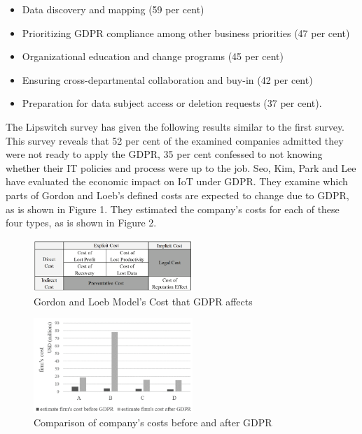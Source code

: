 \documentclass[11pt,english]{article}
\begin{document}
\begin{itemize}
  \item Data discovery and mapping (59 per cent)
  \item Prioritizing GDPR compliance among other business priorities (47 per cent)
  \item Organizational education and change programs (45 per cent)
  \item Ensuring cross-departmental collaboration and buy-in (42 per cent)
  \item Preparation for data subject access or deletion requests (37 per cent).
\end{itemize}
\quad The Lipswitch survey \cite{lipswitch} has given the following results similar to the first survey. This survey reveals that 52 per cent of the examined companies admitted they were not ready to apply the GDPR, 35 per cent confessed to not knowing whether their IT policies and process were up to the job. Seo, Kim, Park and Lee \cite{8190804} have evaluated the economic impact on IoT under
GDPR. They examine which parts of Gordon and Loeb's defined costs \cite{gordon2002economics} are expected to change due to GDPR, as is shown in Figure 1. They estimated the company's costs for each of these four types, as is shown in Figure 2.
\begin{figure}[htp]
    \centering
    \includegraphics[width=6cm]{costs}
    \caption{Gordon and Loeb Model's Cost that GDPR affects}
    \label{fig:costs}
\end{figure}
\begin{figure}[htp]
    \centering
    \includegraphics[width=6cm]{comparation}
    \caption{Comparison of company's costs before and after GDPR}
    \label{fig:comparation}
\end{figure}
\end{document}
